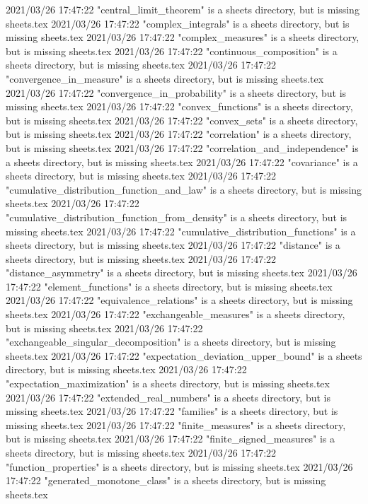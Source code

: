 2021/03/26 17:47:22 "central_limit_theorem" is a sheets directory, but is missing sheets.tex
2021/03/26 17:47:22 "complex_integrals" is a sheets directory, but is missing sheets.tex
2021/03/26 17:47:22 "complex_measures" is a sheets directory, but is missing sheets.tex
2021/03/26 17:47:22 "continuous_composition" is a sheets directory, but is missing sheets.tex
2021/03/26 17:47:22 "convergence_in_measure" is a sheets directory, but is missing sheets.tex
2021/03/26 17:47:22 "convergence_in_probability" is a sheets directory, but is missing sheets.tex
2021/03/26 17:47:22 "convex_functions" is a sheets directory, but is missing sheets.tex
2021/03/26 17:47:22 "convex_sets" is a sheets directory, but is missing sheets.tex
2021/03/26 17:47:22 "correlation" is a sheets directory, but is missing sheets.tex
2021/03/26 17:47:22 "correlation_and_independence" is a sheets directory, but is missing sheets.tex
2021/03/26 17:47:22 "covariance" is a sheets directory, but is missing sheets.tex
2021/03/26 17:47:22 "cumulative_distribution_function_and_law" is a sheets directory, but is missing sheets.tex
2021/03/26 17:47:22 "cumulative_distribution_function_from_density" is a sheets directory, but is missing sheets.tex
2021/03/26 17:47:22 "cumulative_distribution_functions" is a sheets directory, but is missing sheets.tex
2021/03/26 17:47:22 "distance" is a sheets directory, but is missing sheets.tex
2021/03/26 17:47:22 "distance_asymmetry" is a sheets directory, but is missing sheets.tex
2021/03/26 17:47:22 "element_functions" is a sheets directory, but is missing sheets.tex
2021/03/26 17:47:22 "equivalence_relations" is a sheets directory, but is missing sheets.tex
2021/03/26 17:47:22 "exchangeable_measures" is a sheets directory, but is missing sheets.tex
2021/03/26 17:47:22 "exchangeable_singular_decomposition" is a sheets directory, but is missing sheets.tex
2021/03/26 17:47:22 "expectation_deviation_upper_bound" is a sheets directory, but is missing sheets.tex
2021/03/26 17:47:22 "expectation_maximization" is a sheets directory, but is missing sheets.tex
2021/03/26 17:47:22 "extended_real_numbers" is a sheets directory, but is missing sheets.tex
2021/03/26 17:47:22 "families" is a sheets directory, but is missing sheets.tex
2021/03/26 17:47:22 "finite_measures" is a sheets directory, but is missing sheets.tex
2021/03/26 17:47:22 "finite_signed_measures" is a sheets directory, but is missing sheets.tex
2021/03/26 17:47:22 "function_properties" is a sheets directory, but is missing sheets.tex
2021/03/26 17:47:22 "generated_monotone_class" is a sheets directory, but is missing sheets.tex
